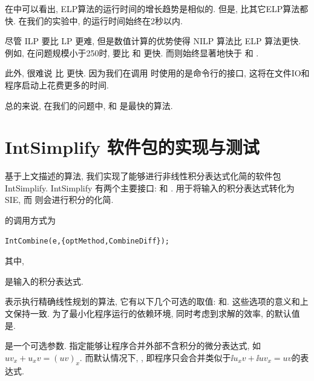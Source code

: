 在中可以看出, ELP算法的运行时间的增长趋势是相似的. 但是, 比其它ELP算法都快. 在我们的实验中, 的运行时间始终在2秒以内. 

尽管 ILP 要比 LP 更难, 但是数值计算的优势使得 NILP 算法比 ELP 算法更快. 例如, 在问题规模小于250时,  要比  和 更快. 而则始终显著地快于 和 . 

此外, 很难说  比  更快. 因为我们在调用 时使用的是命令行的接口, 这将在文件IO和程序启动上花费更多的时间.

总的来说, 在我们的问题中,  和  是最快的算法. 

\section{IntSimplify 软件包的实现与测试}\label{Results-03}
基于上文描述的算法, 我们实现了能够进行非线性积分表达式化简的软件包 IntSimplify. IntSimplify 有两个主要接口:  和 .  用于将输入的积分表达式转化为SIE, 而 则会进行积分的化简.

的调用方式为
\begin{verbatim}
IntCombine(e,{optMethod,CombineDiff});
\end{verbatim}
其中, 
\begin{compactitem}[\textbullet]
\item {}是输入的积分表达式.
\item {}表示执行精确线性规划的算法, 它有以下几个可选的取值: 和. 这些选项的意义和上文保持一致. 为了最小化程序运行的依赖环境, 同时考虑到求解的效率, 的默认值是. 
\item {}是一个可选参数. 指定能够让程序合并外部不含积分的微分表达式, 如$uv_x+u_xv=(uv)_x$. 而默认情况下, , 即程序只会合并类似于$\ii{u_xv}+\ii{uv_x}=uv$的表达式. 
\end{compactitem}

